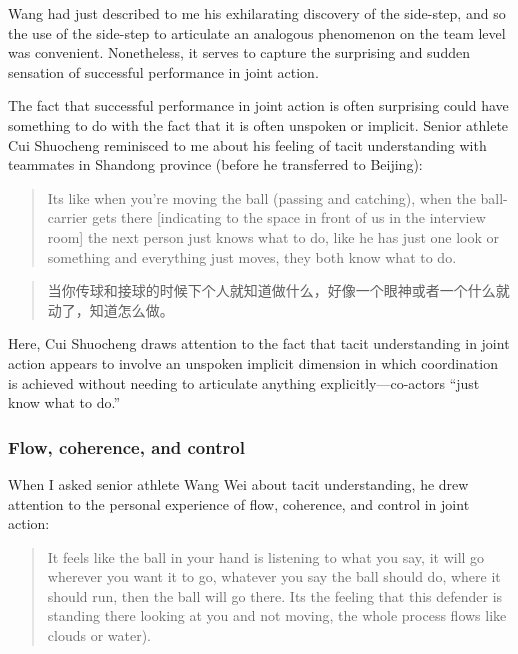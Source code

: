 \begin{CJK}{UTF8}{gbsn}
Wang had just described to me his exhilarating discovery of the side-step, and so the use of the side-step to articulate an analogous phenomenon on the team level was convenient.  Nonetheless, it serves to capture the surprising and sudden sensation of successful performance in joint action.

The fact that successful performance in joint action is often surprising could have something to do with the fact that it is often unspoken or implicit.  Senior athlete Cui Shuocheng reminisced to me about his feeling of tacit understanding with teammates in Shandong province (before he transferred to Beijing):

\begin{quote}
       Its like when you're moving the ball (passing and catching), when the ball-carrier gets there [indicating to the space in front of us in the interview room] the next person just knows what to do, like he has just one look or something and everything just moves, they both know what to do.
\end{quote}

\begin{quote}
     	当你传球和接球的时候下个人就知道做什么，好像一个眼神或者一个什么就动了，知道怎么做。
\end{quote}

Here, Cui Shuocheng draws attention to the fact that tacit understanding in joint action appears to involve an unspoken implicit dimension in which coordination is achieved without needing to articulate anything explicitly---co-actors ``just know what to do.''


\subsubsection{Flow, coherence, and control}
When I asked senior athlete Wang Wei about tacit understanding, he drew attention to the personal experience of flow, coherence, and control in joint action:

  \begin{quote}
    It feels like the ball in your hand is listening to what you say, it will go wherever you want it to go, whatever you say the ball should do, where it should run, then the ball will go there.  Its the feeling that this defender is standing there looking at you and not moving, the whole process flows like clouds or water).
  \end{quote}


\end{CJK}
